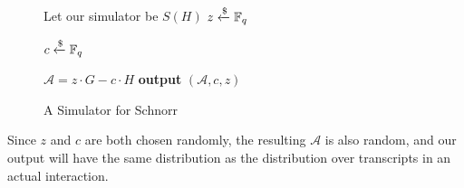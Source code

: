 \begin{figure}[h]
    \centering
    \begin{problem}[width=\linewidth/2]{Let our simulator be $S(H)$}
        $z \xleftarrow{\$} \mathbb{F}_q$ 
        
        $c \xleftarrow{\$} \mathbb{F}_q$
        
        $\mathcal A = z \cdot G - c \cdot H$
        \tcblower
        \textbf{output} $(\mathcal A,c,z)$
    \end{problem}
    \caption{A Simulator for Schnorr}
    \label{fig:schnorr-sim}
\end{figure}

Since $z$ and $c$ are both chosen randomly, the resulting $\mathcal A$ is also random, and our output will have the same distribution as the distribution over transcripts in an actual interaction.

